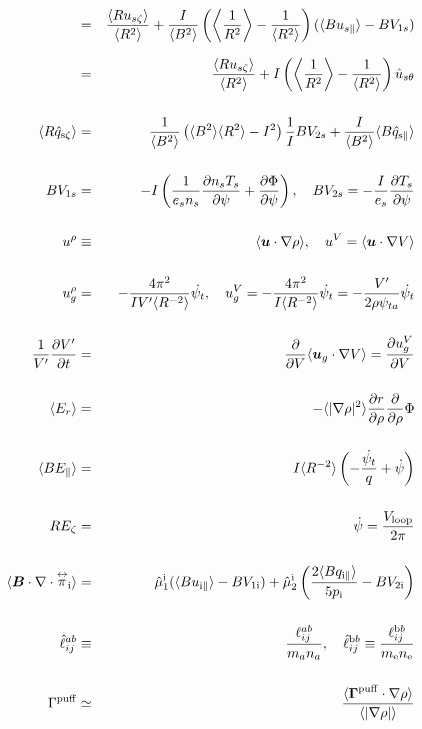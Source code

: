 \documentclass[11pt]{article}
\def\bvec#1{\leavevmode\hbox{\boldmath$#1$}}
\let\vec=\bvec
\def\r#1{{\rm#1}}
\def\ave#1{\left\langle#1\right\rangle}
\def\aves#1{\langle#1\rangle}
\def\dd#1#2{\frac{\partial #1}{\partial #2}}
\def\tensor#1{\mathord{\displaystyle\mathop{#1}^\leftrightarrow}}
\def\para{\parallel}
\def\ddrho{\frac{\partial}{\partial\rho}}
\def\psid{\dot{\psi}}
\def\psit{\psi_t}
\def\psitd{\dot{\psit}}
\def\Er{E_r}
\def\qzt#1{\hat{q}_{\r{#1}\zeta}}
\def\uszt{u_{s\zeta}}
\def\qhatpara#1{\hat{q}_{\r{#1}\para}}
\def\ugrho{u_{g}^\rho}
\def\ugV{u_{g}^V}
\def\bri{\aves{B^2}\aves{R^2} - I^2}
\def\uspara{u_{s\para}}
\begin{document}
\begin{eqnarray}
%
  &=& \frac{\aves{R\uszt}}{\aves{R^2}}
%
  + \frac{I}{\aves{B^2}} \left(  \ave{\frac{1}{R^2}}
			      - \frac{1}{\aves{R^2}} \right)
    (\aves{B\uspara} - BV_{1s})
\nonumber\\[2.5mm]
%
  &=& \frac{\aves{R\uszt}}{\aves{R^2}}
%
  + I \left(  \ave{\frac{1}{R^2}}
			       - \frac{1}{\aves{R^2}} \right) \hat{u}_{s\theta}
\nonumber\\[5mm]
  \ave{R \qzt{s}} &=&
%
    \frac{1}{\aves{B^2}} \left( \bri \right) \frac{1}{I} B V_{2s}
%
  + \frac{I}{\aves{B^2}} \aves{B\qhatpara{s}}
\\[5mm]
  B V_{1s} &=&
%
 - I \left( \frac{1}{e_s n_s} \dd{n_s T_s}{\psi} + \dd{\Phi}{\psi}\right),
\quad
  B V_{2s} =
%
 - \frac{I}{e_s} \dd{T_s}{\psi}
\\[5mm]
  u^\rho &\equiv&
%
  \aves{ \vec{u} \cdot \nabla\rho },
%
  \quad u^V = \aves{ \vec{u} \cdot \nabla V }
\\[5mm]
  \ugrho &=&
%
  - \frac{4\pi^2}{IV'\aves{R^{-2}}} \psitd,
%
  \quad \ugV = - \frac{4\pi^2}{I\aves{R^{-2}}} \psitd = - \frac{V'}{2\rho\psi_{ta}}\psitd
\\[5mm]
  \frac{1}{V'}\dd{V'}{t} &=&
%
  \dd{}{V}\aves{\vec{u}_g\cdot\nabla V} = \dd{u_g^V}{V}
\\[5mm]
  \aves{\Er} &=&
%
  - \aves{|\nabla\rho|^2} \dd{r}{\rho} \ddrho \Phi
\\[5mm]
  \aves{B E_\para} &=&
%
  I \aves{R^{-2}} \left( - \frac{\psitd}{q} + \psid \right)
\\[5mm]
  R E_\zeta &=&
%
  \psid
%
  = \frac{V_\r{loop}}{2\pi}
\\[5mm]
  \aves{\vec{B}\cdot\nabla\cdot\tensor{\pi}_\r{i}} &=&
%
  \hat{\mu}_1^\r{i} ( \aves{Bu_{\r{i}\para}} - BV_{1\r{i}}) 
%
  + \hat{\mu}_2^\r{i} \left( \frac{2\aves{Bq_{\r{i}\para}}}{5p_\r{i}} -
		       BV_{2\r{i}}\right)
\\[5mm]
  \hat{\ell}_{ij}^{ab} &\equiv& \frac{\ell_{ij}^{ab}}{m_an_a},
  \quad
  \hat{\ell}_{ij}^{\r{b}b} \equiv \frac{\ell_{ij}^{\r{b}b}}{m_\r{e}n_\r{e}}
\\[5mm]
  \Gamma^\r{puff} &\simeq& \frac{\aves{\vec{\Gamma}^\r{puff}\cdot\nabla\rho}}{\aves{|\nabla\rho|}}
\end{eqnarray}
\end{document}
